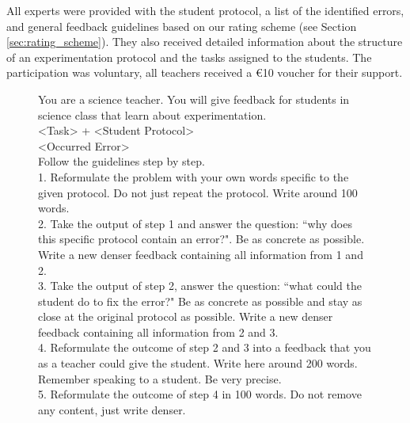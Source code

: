 All experts were provided with the student protocol, a list of the identified errors, and general feedback guidelines based on our rating scheme (see Section \ref{sec:rating_scheme}). They also received detailed information about the structure of an experimentation protocol and the tasks assigned to the students. The participation was voluntary, all teachers received a €10 voucher for their support.
% 


\begin{figure}[htbp]
    \centering
    \begin{tcolorbox}[colback=gray!5!white, colframe=gray!75!black, width=\textwidth, arc=1mm, auto outer arc, boxrule=0.2mm, title=Prompt for automated feedback generation on experimental protocols]
    \begin{small}
        You are a science teacher. You will give feedback for students in science class that learn about experimentation. \\

        \textless Task\textgreater{}  + \textless Student Protocol\textgreater \\

        \textless Occurred Error\textgreater \\

        Follow the guidelines step by step. \\
        1. Reformulate the problem with your own words specific to the given protocol. Do not just repeat the protocol. Write around 100 words. \\
        2. Take the output of step 1 and answer the question: ``why does this specific protocol contain an error?". Be as concrete as possible. Write a new denser feedback containing all information from 1 and 2. \\
        3. Take the output of step 2, answer the question: ``what could the student do to fix the error?" Be as concrete as possible and stay as close at the original protocol as possible. Write a new denser feedback containing all information from 2 and 3. \\
        4. Reformulate the outcome of step 2 and 3 into a feedback that you as a teacher could give the student. Write here around 200 words. Remember speaking to a student. Be very precise. \\
        5. Reformulate the outcome of step 4 in 100 words. Do not remove any content, just write denser. \\
        

\end{small}
\end{tcolorbox}
\end{figure}
